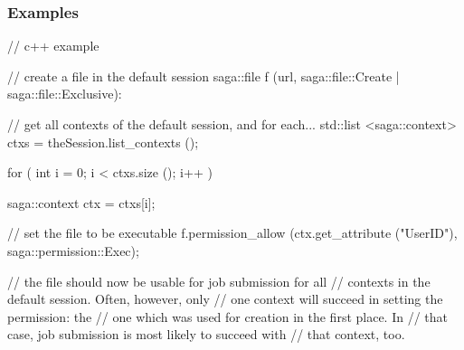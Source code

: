  
 \subsubsection{Examples}
 
 \begin{mycode}
 
  // c++ example
  {
    // create a file in the default session
    saga::file f (url, saga::file::Create 
                     | saga::file::Exclusive):
 
    // get all contexts of the default session, and for each...
    std::list <saga::context> ctxs = theSession.list_contexts ();
 
    for ( int i = 0; i < ctxs.size (); i++ )
    {
      saga::context ctx = ctxs[i];
 
      // set the file to be executable
      f.permission_allow (ctx.get_attribute ("UserID"),
                          saga::permission::Exec);
    }
 
    // the file should now be usable for job submission for all
    // contexts in the default session.  Often, however, only 
    // one context will succeed in setting the permission: the 
    // one which was used for creation in the first place.  In 
    // that case, job submission is most likely to succeed with 
    // that context, too.
  }
 \end{mycode}
 
